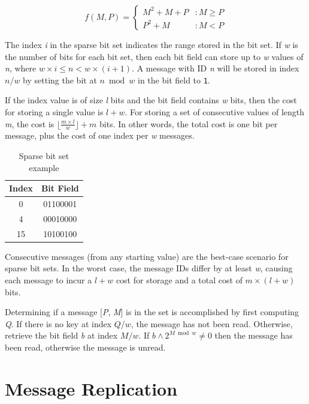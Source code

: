  \begin{equation}
   f(M,P) = \left\{
     \begin{array}{lr}
       M^{2} + M + P & : M \geq P \\
       P^{2} + M & : M < P
     \end{array}
   \right.
   \label{eq:elegantpairing}
\end{equation}

The index \textit{i} in the sparse bit set indicates the range stored in the bit set. If \textit{w} is the number of bits for each bit set, then each bit field can store up to \textit{w} values of \textit{n}, where $w \times i \leq n < w \times (i + 1)$. A message with ID \textit{n} will be stored in index $n/w$ by setting the bit at $n \bmod w$ in the bit field to \texttt{1}.

If the index value is of size \textit{l} bits and the bit field contains \textit{w} bits, then the cost for storing a single value is $l + w$. For storing a set of consecutive values of length \textit{m}, the cost is $\lfloor \frac{m \times l}{w} \rfloor + m$ bits. In other words, the total cost is one bit per message, plus the cost of one index per \textit{w} messages.

\begin{table}
\centering
\caption{Sparse bit set example}
\begin{tabular}{|c|c|} \hline
Index & Bit Field \\ \hline
0 & 01100001 \\ \hline
4 & 00010000 \\ \hline
15 & 10100100 \\ \hline
\end{tabular}
\label{fig:bitset}
\end{table}

Consecutive messages (from any starting value) are the best-case scenario for sparse bit sets. In the worst case, the message IDs differ by at least \textit{w}, causing each message to incur a $l + w$ cost for storage and a total cost of $m \times (l + w)$ bits.

Determining if a message [\textit{P}, \textit{M}] is in the set is accomplished by first computing \textit{Q}. If there is no key at index $Q/w$, the message has not been read. Otherwise, retrieve the bit field \textit{b} at index $M / w$. If $b \wedge 2^{M \bmod w} \neq 0$ then the message has been read, otherwise the message is unread.

\section{Message Replication}

